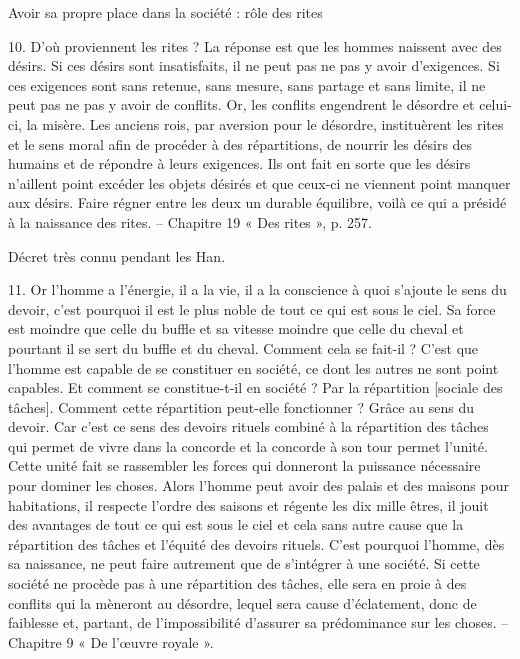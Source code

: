 Avoir sa propre place dans la société : rôle des rites


\begin{singlequote}
    10.	D’où proviennent les rites ? La réponse est que les hommes naissent avec des désirs. Si ces désirs sont insatisfaits, il ne peut pas ne pas y avoir d’exigences. Si ces exigences sont sans retenue, sans mesure, sans partage et sans limite, il ne peut pas ne pas y avoir de conflits. Or, les conflits engendrent le désordre et celui-ci, la misère. Les anciens rois, par aversion pour le désordre, instituèrent les rites et le sens moral afin de procéder à des répartitions, de nourrir les désirs des humains et de répondre à leurs exigences. Ils ont fait en sorte que les désirs n’aillent point excéder les objets désirés et que ceux-ci ne viennent point manquer aux désirs. Faire régner entre les deux un durable équilibre, voilà ce qui a présidé à la naissance des rites.
-- Chapitre 19 « Des rites », p. 257.
\end{singlequote}

Décret très connu pendant les Han. 



11.	Or l’homme a l’énergie, il a la vie, il a la conscience à quoi s’ajoute le sens du devoir, c’est pourquoi il est le plus noble de tout ce qui est sous le ciel. Sa force est moindre que celle du buffle et sa vitesse moindre que celle du cheval et pourtant il se sert du buffle et du cheval. Comment cela se fait-il ? C’est que l’homme est capable de se constituer en société, ce dont les autres ne sont point capables. Et comment se constitue-t-il en société ? Par la répartition [sociale des tâches]. Comment cette répartition peut-elle fonctionner ? Grâce au sens du devoir. Car c’est ce sens des devoirs rituels combiné à la répartition des tâches qui permet de vivre dans la concorde et la concorde à son tour permet l’unité. Cette unité fait se rassembler les forces qui donneront la puissance nécessaire pour dominer les choses. Alors l’homme peut avoir des palais et des maisons pour habitations, il respecte l’ordre des saisons et régente les dix mille êtres, il jouit des avantages de tout ce qui est sous le ciel et cela sans autre cause que la répartition des tâches et l’équité des devoirs rituels. C’est pourquoi l’homme, dès sa naissance, ne peut faire autrement que de s’intégrer à une société. Si cette société ne procède pas à une répartition des tâches, elle sera en proie à des conflits qui la mèneront au désordre, lequel sera cause d’éclatement, donc de faiblesse et, partant, de l’impossibilité d’assurer sa prédominance sur les choses.
-- Chapitre 9 « De l’œuvre royale ».
